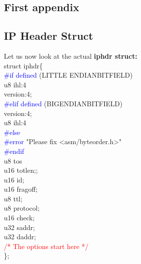\documentclass{uathesis}
\begin{document}
\begin{appendices}
  \chapter{First appendix}
  \section{IP Header Struct}
  Let us now look at the actual \textbf{iphdr struct:} \\
\noindent struct iphdr\big\{\\
\indent\indent \textcolor{blue}{{\#}if defined} (\textunderscore LITTLE\textunderscore
ENDIAN\textunderscore BITFIELD)\\
\indent\indent\indent \textunderscore u8\hspace{5mm} ihl:4\\
\indent\indent\indent \phantom{o}\phantom{o}\phantom{o}\hspace{5mm} version:4;\\
\indent\indent \textcolor{blue}{{\#}elif defined} (\textunderscore BIG\textunderscore ENDIAN\textunderscore BITFIELD)\\
\indent\indent\indent \phantom{o}\phantom{o}\phantom{o}\hspace{5mm} version:4;\\
\indent\indent\indent \textunderscore u8\hspace{5mm} ihl:4\\
\indent\indent \textcolor{blue}{{\#}else}\\
\indent\indent\indent \textcolor{blue}{{\#}error}\hspace{1mm} "Please fix <asm/byteorder.h>"\\
\indent\indent \textcolor{blue}{{\#}endif}\\
\indent\indent\indent \textunderscore u8 \phantom{o}\phantom{o}\phantom{o} tos \\
\indent\indent\indent \textunderscore u16 \phantom{o}\phantom{o} tot\textunderscore len;; \\
\indent\indent\indent \textunderscore u16 \phantom{o}\phantom{o} id;\\
\indent\indent\indent \textunderscore u16 \phantom{o}\phantom{o} frag\textunderscore off;\\
\indent\indent\indent \textunderscore u8  \phantom{o}\phantom{o}\phantom{o} ttl;\\
\indent\indent\indent \textunderscore u8  \phantom{o}\phantom{o}\phantom{o} protocol;\\
\indent\indent\indent \textunderscore u16 \phantom{o}\phantom{o} check;\\
\indent\indent\indent \textunderscore u32 \phantom{o}\phantom{o} saddr;\\
\indent\indent\indent \textunderscore u32 \phantom{o}\phantom{o} daddr;\\
\indent\indent\indent\textcolor{red}{{\//*} {The options start here} {\/*/}} \\
\big\};\\


\end{appendices}
\end{document}
